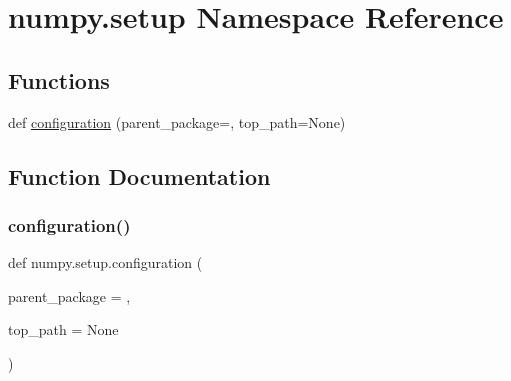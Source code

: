 \hypertarget{namespacenumpy_1_1setup}{}\section{numpy.\+setup Namespace Reference}
\label{namespacenumpy_1_1setup}
\subsection*{Functions}
\begin{DoxyCompactItemize}
\item 
def \hyperlink{namespacenumpy_1_1setup_a053b2489bebd5fc5a97442b973ccdb99}{configuration} (parent\+\_\+package=\textquotesingle{}\textquotesingle{}, top\+\_\+path=None)
\end{DoxyCompactItemize}


\subsection{Function Documentation}
\mbox{\label{namespacenumpy_1_1setup_a053b2489bebd5fc5a97442b973ccdb99}} 
\subsubsection{\texorpdfstring{configuration()}{configuration()}}
{\footnotesize\ttfamily def numpy.\+setup.\+configuration (\begin{DoxyParamCaption}\item[{}]{parent\+\_\+package = {\ttfamily \textquotesingle{}\textquotesingle{}},  }\item[{}]{top\+\_\+path = {\ttfamily None} }\end{DoxyParamCaption})}


